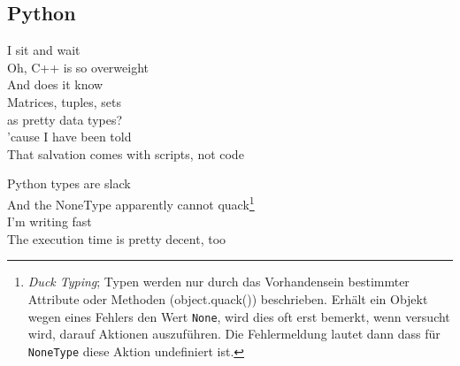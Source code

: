 \subsection{Python}

I sit and wait  \\
Oh, C++ is so overweight  \\
And does it know  \\
Matrices, tuples, sets \\
as pretty data types? \ \  \\

'cause I have been told \\
That salvation comes with scripts, not code \\




Python types are slack \\
And the NoneType apparently cannot quack\footnote{\scriptsize \textit{Duck Typing}; Typen werden nur durch das Vorhandensein bestimmter Attribute oder Methoden (\glqq object.quack()\grqq) beschrieben. Erhält ein Objekt wegen eines Fehlers den Wert \texttt{None}, wird dies oft erst bemerkt, wenn versucht wird, darauf Aktionen auszuführen. Die Fehlermeldung lautet dann dass für \texttt{NoneType} diese Aktion undefiniert ist.} \\
I'm writing fast \\
The execution time is pretty decent, too \\


		
\pagebreak
